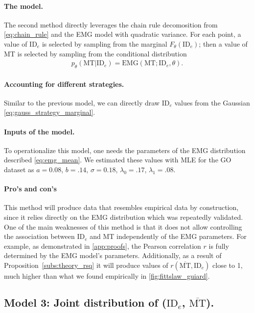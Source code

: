 \documentclass[acmlarge, manuscript,review]{acmart}
\newcommand{\mmt}{\ensuremath{\overline{\mt}}\xspace}
\newcommand{\mt}{\ensuremath{{\text{MT}}}\xspace}
\newcommand{\ide}{\ensuremath{{\text{ID}_e}}\xspace}
\begin{document}
\paragraph{The model.} The second method directly leverages the chain rule decomosition from \autoref{eq:chain_rule} and the EMG model with quadratic variance. For each point, a value of $\ide$ is selected by sampling from the marginal $F_{\theta}(\ide)$; then a value of MT is selected by sampling from the conditional distribution
\begin{align}
	p_{\theta}(\mt|\ide) = \text{EMG}(\mt; \ide, \theta).
\end{align}

\paragraph{Accounting for different strategies.} Similar to the previous model, we can directly draw \ide values from the Gaussian \autoref{eq:gauss_strategy_marginal}.%

\paragraph{Inputs of the model.} To operationalize this model, one needs the parameters of the EMG distribution described \autoref{eq:emg_mean}. We estimated these values with MLE for the GO dataset as $a = 0.08$, $b = .14$, $\sigma=0.18$, $\lambda_0 = .17$, $\lambda_1 = .08$. 

\paragraph{Pro's and con's} This method will produce data that resembles empirical data by construction, since it relies directly on the EMG distribution which was repeatedly validated. One of the main weaknesses of this method is that it does not allow controlling the association between \ide and MT independently of the EMG parameters. For example, as demonstrated in \autoref{app:proofs}, the Pearson correlation $r$ is fully determined by the EMG model's parameters. Additionally, as a result of Proposition~\ref{subs:theory_rsq} it will produce values of $r(\mmt, \ide)$ close to 1, much higher than what we found empirically in \autoref{fig:fittslaw_guiard}.

\subsection{Model 3: Joint distribution of (\ide, \mmt).}
\end{document}
